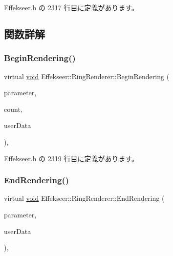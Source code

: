  Effekseer.\+h の 2317 行目に定義があります。



\subsection{関数詳解}
\mbox{\label{class_effekseer_1_1_ring_renderer_af9e48de3e9024b7e2abd950e4300b426}} 
\subsubsection{\texorpdfstring{Begin\+Rendering()}{BeginRendering()}}
{\footnotesize\ttfamily virtual \mbox{\hyperlink{namespace_effekseer_ab34c4088e512200cf4c2716f168deb56}{void}} Effekseer\+::\+Ring\+Renderer\+::\+Begin\+Rendering (\begin{DoxyParamCaption}\item[{const \mbox{\hyperlink{struct_effekseer_1_1_ring_renderer_1_1_node_parameter}{Node\+Parameter}} \&}]{parameter,  }\item[{int32\+\_\+t}]{count,  }\item[{\mbox{\hyperlink{namespace_effekseer_ab34c4088e512200cf4c2716f168deb56}{void}} $\ast$}]{user\+Data }\end{DoxyParamCaption})\hspace{0.3cm}{\ttfamily [inline]}, {\ttfamily [virtual]}}



 Effekseer.\+h の 2319 行目に定義があります。

\mbox{\label{class_effekseer_1_1_ring_renderer_a681963d704b42577665a10722140eb34}} 
\subsubsection{\texorpdfstring{End\+Rendering()}{EndRendering()}}
{\footnotesize\ttfamily virtual \mbox{\hyperlink{namespace_effekseer_ab34c4088e512200cf4c2716f168deb56}{void}} Effekseer\+::\+Ring\+Renderer\+::\+End\+Rendering (\begin{DoxyParamCaption}\item[{const \mbox{\hyperlink{struct_effekseer_1_1_ring_renderer_1_1_node_parameter}{Node\+Parameter}} \&}]{parameter,  }\item[{\mbox{\hyperlink{namespace_effekseer_ab34c4088e512200cf4c2716f168deb56}{void}} $\ast$}]{user\+Data }\end{DoxyParamCaption})\hspace{0.3cm}{\ttfamily [inline]}, {\ttfamily [virtual]}}




